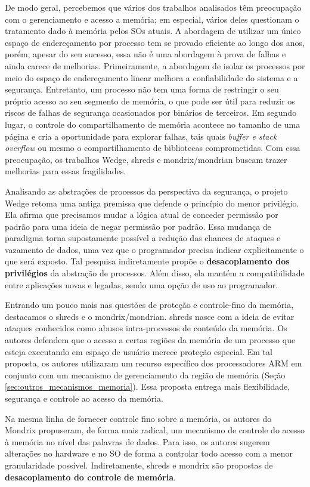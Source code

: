 De modo geral, percebemos que vários dos trabalhos analisados têm preocupação com o gerenciamento e acesso a
memória; em especial, vários deles questionam o tratamento dado à memória pelos
SOs atuais.  A abordagem de utilizar um único espaço de endereçamento por
processo tem se provado eficiente ao longo dos anos, porém, apesar do seu
sucesso, essa não é uma abordagem à prova de falhas e ainda carece de
melhorias. Primeiramente, a abordagem de isolar os processos por meio do
espaço de endereçamento linear melhora a confiabilidade do sistema e a
segurança. Entretanto, um processo não tem uma forma de restringir o seu próprio
acesso ao seu segmento de memória, o que pode ser útil para reduzir os riscos de
falhas de segurança ocasionados por binários de terceiros. Em segundo lugar, o
controle do compartilhamento de memória acontece no tamanho de uma página e
cria a oportunidade para explorar falhas, tais quais \emph{buffer e stack
overflow} ou mesmo o compartilhamento de bibliotecas comprometidas. Com essa preocupação, os
trabalhos Wedge, shreds e mondrix/mondrian buscam trazer melhorias para essas fragilidades.

Analisando as abstrações de processos da perspectiva da segurança, o projeto
Wedge retoma uma antiga premissa que defende o princípio do menor privilégio.
Ela afirma que precisamos mudar a lógica atual de conceder permissão por
padrão para uma ideia de negar permissão por padrão. Essa mudança de paradigma
torna supostamente possível a redução das chances de ataques e vazamento de
dados, uma vez que o programador precisa indicar explicitamente o que será
exposto. Tal pesquisa indiretamente propõe o \textbf{desacoplamento dos
privilégios} da abstração de processos. Além disso, ela mantém a
compatibilidade entre aplicações novas e legadas, sendo uma opção de uso ao programador.

Entrando um pouco mais nas questões de proteção e controle-fino da memória,
destacamos o shreds e o mondrix/mondrian. shreds nasce com a ideia de evitar
ataques conhecidos como abusos intra-processos de conteúdo da memória. Os
autores defendem que o acesso a certas regiões da memória de um processo
que esteja executando em espaço de usuário merece proteção especial. Em tal proposta, os
autores utilizaram um recurso específico dos processadores ARM em conjunto com
um mecanismo de gerenciamento da região de memória (Seção
\ref{sec:outros_mecanismos_memoria}). Essa proposta entrega mais flexibilidade,
segurança e controle ao acesso da memória.

Na mesma linha de fornecer controle fino sobre a memória, os autores do Mondrix
propuseram, de forma mais radical, um mecanismo de controle do acesso à memória
no nível das palavras de dados. Para isso, os autores sugerem alterações no
hardware e no SO de forma a controlar todo acesso com a menor granularidade
possível. Indiretamente, shreds e mondrix são propostas de
\textbf{desacoplamento do controle de memória}.

